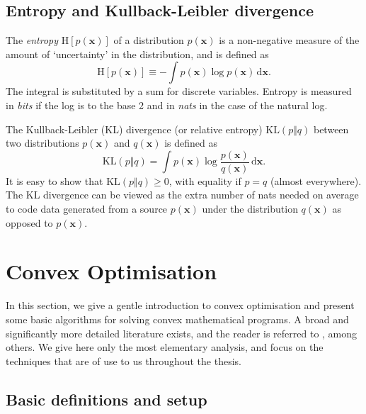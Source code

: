\subsection{Entropy and Kullback-Leibler divergence}
\label{sec:entropy}

The \emph{entropy} $\mathrm{H}[p(\mathbf{x})]$ of a distribution $p(\mathbf{x})$ is a non-negative measure of the amount of `uncertainty' in the distribution, and is defined as
\begin{equation}
	\mathrm{H}[p(\mathbf{x})] \equiv -\int p(\mathbf{x})\log p(\mathbf{x}) \, \mathrm{d}\mathbf{x}.
\end{equation}
The integral is substituted by a sum for discrete variables. Entropy is measured in \emph{bits} if the log is to the base 2 and in \emph{nats} in the case of the natural log.

The Kullback-Leibler (KL) divergence (or relative entropy) $\mathrm{KL}(p \Vert q)$ between two distributions $p(\mathbf{x})$ and $q(\mathbf{x})$ is defined as
\begin{equation}
	\mathrm{KL}(p \Vert q) = \int p(\mathbf{x})\log\frac{p(\mathbf{x})}{q(\mathbf{x})} \, \mathrm{d}\mathbf{x}.
\end{equation}
It is easy to show that $\mathrm{KL}(p \Vert q) \geq 0$, with equality if $p = q$ (almost everywhere). The KL divergence can be viewed as the extra number of nats needed on average to code data generated from a source $p(\mathbf{x})$ under the distribution $q(\mathbf{x})$ as opposed to $p(\mathbf{x})$.




\section{Convex Optimisation}

In this section, we give a gentle introduction to convex optimisation and present some basic algorithms for solving convex mathematical programs. A broad and significantly more detailed literature exists, and the reader is referred to \cite{nemirovski, rockafellar, fletcher, bv_cvxbook, borwein, bubeck}, among others. We give here only the most elementary analysis, and focus on the techniques that are of use to us throughout the thesis.

\subsection{Basic definitions and setup}
\label{sec:cvxopt-defs}

